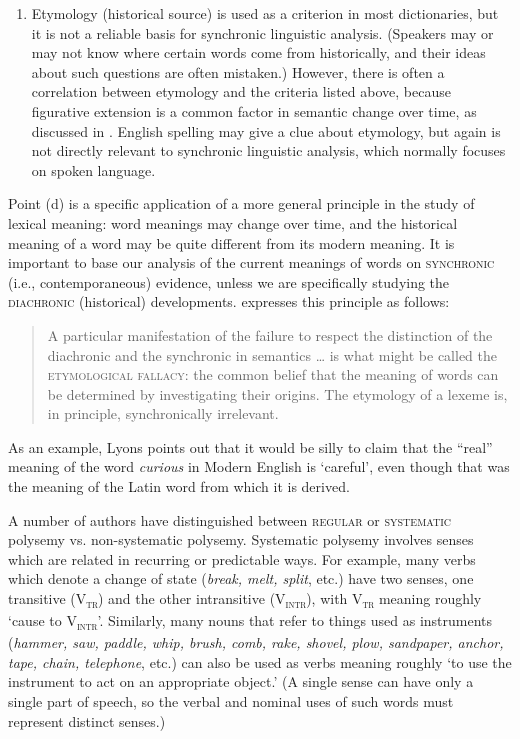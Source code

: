 \begin{enumerate}[label=\alph*.]
\item Etymology (historical source) is used as a criterion in most dictionaries, but it is not a reliable basis for synchronic linguistic analysis. (Speakers may or may not know where certain words come from historically, and their ideas about such questions are often mistaken.) However, there is often a correlation between etymology and the criteria listed above, because figurative extension is a common factor in semantic change over time, as discussed in . English spelling may give a clue about etymology, but again is not directly relevant to synchronic linguistic analysis, which normally focuses on spoken language.
\end{enumerate}

Point (d) is a specific application of a more general principle in the study of lexical meaning: word meanings may change over time, and the historical meaning of a word may be quite different from its modern meaning. It is important to base our analysis of the current meanings of words on \textsc{synchronic} (i.e., contemporaneous) evidence, unless we are specifically studying the \textsc{diachronic} (historical) developments. \citet[244]{Lyons1977} expresses this principle as follows:


\begin{quote}
A particular manifestation of the failure to respect the distinction of the diachronic and the synchronic in semantics … is what might be called the \textsc{etymological fallacy}: the common belief that the meaning of words can be determined by investigating their origins. The etymology of a lexeme is, in principle, synchronically irrelevant.
\end{quote}


As an example, Lyons points out that it would be silly to claim that the “real” meaning of the word \textit{curious} in Modern English is ‘careful’, even though that was the meaning of the  {Latin} word from which it is derived.



A number of authors have distinguished between \textsc{regular} or \textsc{systematic} polysemy vs. non-systematic polysemy. Systematic polysemy involves senses which are related in recurring or predictable ways. For example, many verbs which denote a change of state (\textit{break, melt, split}, etc.) have two senses, one transitive (V\textsc{\textsubscript{tr}}) and the other intransitive (V\textsc{\textsubscript{intr}}), with V\textsc{\textsubscript{tr}} meaning roughly ‘cause to V\textsc{\textsubscript{intr}}’. Similarly, many nouns that refer to things used as instruments (\textit{hammer, saw, paddle, whip, brush, comb, rake, shovel, plow, sandpaper, anchor, tape, chain, telephone}, etc.) can also be used as verbs meaning roughly ‘to use the instrument to act on an appropriate object.’ (A single sense can have only a single part of speech, so the verbal and nominal uses of such words must represent distinct senses.)




